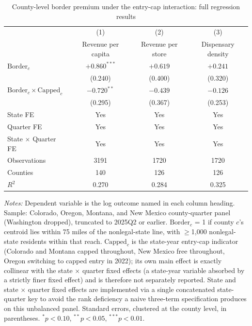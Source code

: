 \begin{table}[htbp]
\centering
\caption{County-level border premium under the entry-cap interaction: full regression results}
\label{tab:capped_regression_journal}
\footnotesize
\begin{tabular}{lccc}
\toprule
 & (1) & (2) & (3) \\
 & Revenue per capita & Revenue per store & Dispensary density \\
\midrule
$\text{Border}_c$ & $+0.860^{***}$ & $+0.619$ & $+0.241$ \\
 & (0.240) & (0.400) & (0.320) \\
$\text{Border}_c \times \text{Capped}_c$ & $-0.720^{**}$ & $-0.439$ & $-0.126$ \\
 & (0.295) & (0.367) & (0.253) \\
\midrule
State FE & Yes & Yes & Yes \\
Quarter FE & Yes & Yes & Yes \\
State $\times$ Quarter FE & Yes & Yes & Yes \\
\midrule
Observations & 3191 & 1720 & 1720 \\
Counties & 140 & 126 & 126 \\
$R^2$ & 0.270 & 0.284 & 0.325 \\
\bottomrule
\end{tabular}
\begin{minipage}{0.98\textwidth}
\vspace{0.3em}
\footnotesize
\textit{Notes:} Dependent variable is the log outcome named in each column heading. Sample: Colorado, Oregon, Montana, and New Mexico county-quarter panel (Washington dropped), truncated to 2025Q2 or earlier. $\text{Border}_c$ = 1 if county $c$'s centroid lies within 75 miles of the nonlegal-state line, with $\geq$1,000 nonlegal-state residents within that reach. $\text{Capped}_c$ is the state-year entry-cap indicator (Colorado and Montana capped throughout, New Mexico free throughout, Oregon switching to capped entry in 2022); its own main effect is exactly collinear with the state $\times$ quarter fixed effects (a state-year variable absorbed by a strictly finer fixed effect) and is therefore not separately reported. State and state $\times$ quarter fixed effects are implemented via a single concatenated state-quarter key to avoid the rank deficiency a naive three-term specification produces on this unbalanced panel. Standard errors, clustered at the county level, in parentheses. $^{*}p<0.10$, $^{**}p<0.05$, $^{***}p<0.01$.
\end{minipage}
\end{table}
